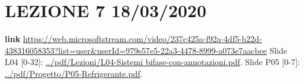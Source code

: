 \section*{LEZIONE 7 18/03/2020}
\textbf{link} \url{https://web.microsoftstream.com/video/237c425a-f92a-4df5-b22d-438316058353?list=user&userId=979e57e5-22a3-4478-8999-a073e7aacbee}\newline
\newline
Slide L04 [0-32]: \url{../pdf/Lezioni/L04-Sistemi bifase-con-annotazioni.pdf}.\newline
\newline
Slide P05 [0-7]: \url{../pdf/Progetto/P05-Refrigerante.pdf}.\newline
\newline





